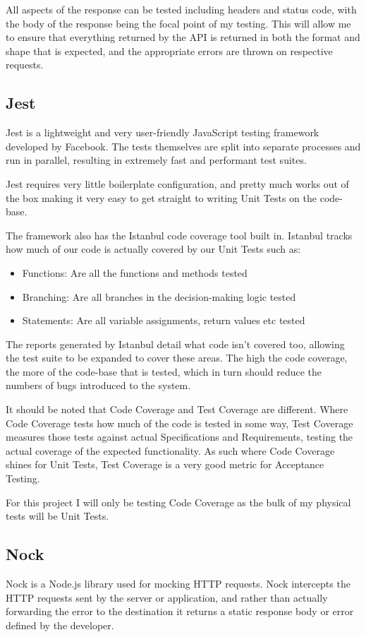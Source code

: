 All aspects of the response can be tested including headers and status code, with the body of the response being the focal point of my testing. This will allow me to ensure that everything returned by the API is returned in both the format and shape that is expected, and the appropriate errors are thrown on respective requests.
\subsection{Jest}
Jest is a lightweight and very user-friendly JavaScript testing framework developed by Facebook. The tests themselves are split into separate processes and run in parallel, resulting in extremely fast and performant test suites.

Jest requires very little boilerplate configuration, and pretty much works out of the box making it very easy to get straight to writing Unit Tests on the code-base.

The framework also has the Istanbul code coverage tool built in. Istanbul tracks how much of our code is actually covered by our Unit Tests such as:
\begin{itemize}
    \item Functions: Are all the functions and methods tested
    \item Branching: Are all branches in the decision-making logic tested
    \item Statements: Are all variable assignments, return values etc tested
\end{itemize}

The reports generated by Istanbul detail what code isn't covered too, allowing the test suite to be expanded to cover these areas. The high the code coverage, the more of the code-base that is tested, which in turn should reduce the numbers of bugs introduced to the system.

It should be noted that Code Coverage and Test Coverage are different. Where Code Coverage tests how much of the code is tested in some way, Test Coverage measures those tests against actual Specifications and Requirements, testing the actual coverage of the expected functionality. As such where Code Coverage shines for Unit Tests, Test Coverage is a very good metric for Acceptance Testing.

For this project I will only be testing Code Coverage as the bulk of my physical tests will be Unit Tests.
\subsection{Nock}
Nock is a Node.js library used for mocking HTTP requests. Nock intercepts the HTTP requests sent by the server or application, and rather than actually forwarding the error to the destination it returns a static response body or error defined by the developer. 

